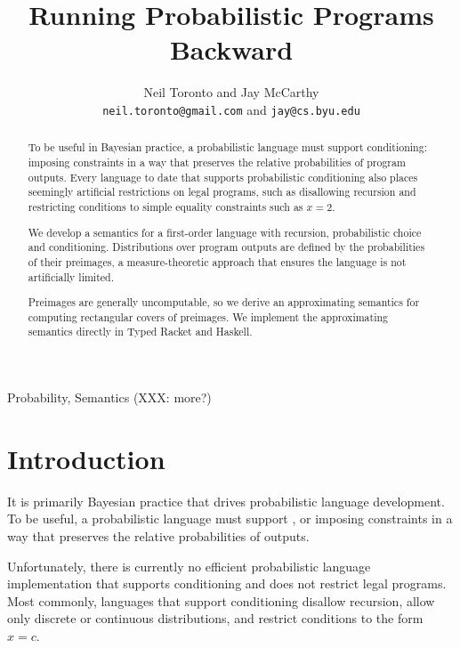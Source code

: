 \documentclass{llncs}
\title{Running Probabilistic Programs Backward}
\author{Neil Toronto and Jay McCarthy\\
\footnotesize{\texttt{neil.toronto@gmail.com} and \texttt{jay@cs.byu.edu}}}
\institute{PLT @ Brigham Young University, Provo, Utah, USA}
\date{}
\begin{document}
\maketitle

\begin{abstract}
To be useful in Bayesian practice, a probabilistic language must support conditioning: imposing constraints in a way that preserves the relative probabilities of program outputs.
Every language to date that supports probabilistic conditioning also places seemingly artificial restrictions on legal programs, such as disallowing recursion and restricting conditions to simple equality constraints such as $x = \mathrm{2}$.

We develop a semantics for a first-order language with recursion, probabilistic choice and conditioning.
Distributions over program outputs are defined by the probabilities of their preimages, a measure-theoretic approach that ensures the language is not artificially limited.

Preimages are generally uncomputable, so we derive an approximating semantics for computing rectangular covers of preimages.
We implement the approximating semantics directly in Typed Racket and Haskell.
\end{abstract}

\keywords Probability, Semantics (XXX: more?)


\section{Introduction}

It is primarily Bayesian practice that drives probabilistic language development.
To be useful, a probabilistic language must support , or imposing constraints in a way that preserves the relative probabilities of outputs.

Unfortunately, there is currently no efficient probabilistic language implementation that supports conditioning and does not restrict legal programs.
Most commonly, languages that support conditioning disallow recursion, allow only discrete or continuous distributions, and restrict conditions to the form $\mathit{x} = \mathit{c}$.
\end{document}
